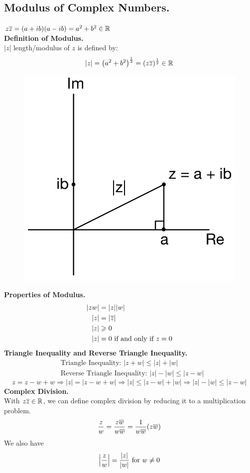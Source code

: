 \documentclass[11pt]{article}
\DeclarePairedDelimiter\abs{\lvert}{\rvert}
\begin{document}
\subsection{Modulus of Complex Numbers.}
$z\overline{z} = (a + ib)(a - ib) = a^2 + b^2 \in \mathbb{R}$  \\

\textbf{Definition of Modulus.} \\
$|z|$ length/modulus of $z$ is defined by:
$$|z| = \left(a^2 + b^2\right)^{\frac{1}{2}} = (z\overline{z})^{\frac{1}{2}} \in \mathbb{R}$$
\begin{figure}[H]
\includegraphics[scale = 0.19]{1_3}
\centering
\end{figure}
\textbf{Properties of Modulus.} 
\begin {align*}
|zw| &= |z||w| \\
|z| &= |\overline{z}| \\  
|z| &\geqslant 0 \\
|z| &= 0 \text{ if and only if } z = 0
\end{align*}
\newline
\textbf{Triangle Inequality and Reverse Triangle Inequality.}
\begin{align*}
      &\text{Triangle Inequality: } |z + w| \leqslant |z| + |w| \\
      &\text{Reverse Triangle Inequality: }|z| - |w| \leqslant |z - w|
\end{align*}
$$z = z - w + w \Rightarrow |z| = |z - w + w| \Rightarrow |z| \leqslant |z - w| + |w| \Rightarrow |z| - |w| \leqslant |z - w|$$
\newline
\textbf{Complex Division.} \\
With $z\overline{z} \in \mathbb{R}$, we can define complex division by reducing it to a multiplication problem. 
$$\frac{z}{w} = \frac{z\overline{w}}{w\overline{w}} = \frac{1}{w\overline{w}}(z\overline{w})$$ 
We also have 
\begin{equation*} 
\abs[\Big]{\frac{z}{w}} = \frac{|z|}{|w|} \mbox{ for } w \neq 0 
\end{equation*}
\end{document}
